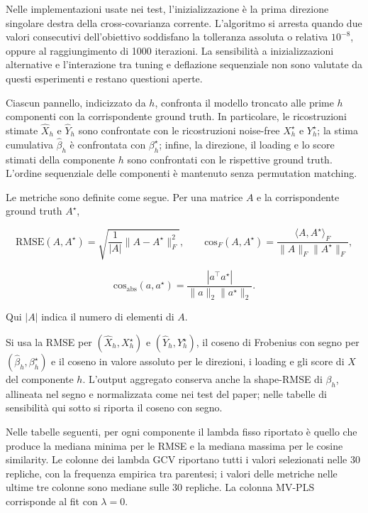 \documentclass[11pt,a4paper]{article}
\begin{document}
Nelle implementazioni usate nei test, l'inizializzazione è la prima direzione singolare destra
della cross-covarianza corrente. L'algoritmo si arresta quando due valori consecutivi
dell'obiettivo soddisfano la tolleranza assoluta o relativa $10^{-8}$, oppure al raggiungimento
di 1000 iterazioni. La sensibilità a inizializzazioni alternative e l'interazione tra tuning e
deflazione sequenziale non sono valutate da questi esperimenti e restano questioni aperte.

Ciascun pannello, indicizzato da $h$, confronta il modello troncato alle prime $h$ componenti con
la corrispondente ground truth. In particolare, le ricostruzioni stimate
$\widehat X_h$ e $\widehat Y_h$ sono confrontate con le ricostruzioni noise-free
$X_h^\star$ e $Y_h^\star$; la stima cumulativa $\widehat\beta_h$ è confrontata con
$\beta_h^\star$; infine, la direzione, il loading e lo score stimati della componente $h$ sono
confrontati con le rispettive ground truth. L'ordine sequenziale delle componenti è
mantenuto senza permutation matching.

Le metriche sono definite come segue. Per una matrice $A$ e la corrispondente ground truth $A^\star$,

\[
  \mathrm{RMSE}(A,A^\star) =
  \sqrt{\frac{1}{|A|}\|A-A^\star\|_F^2},
  \qquad
  \mathrm{cos}_F(A,A^\star) =
  \frac{\langle A,A^\star\rangle_F}{\|A\|_F\|A^\star\|_F},
\]

\[
  \mathrm{cos}_{\mathrm{abs}}(a,a^\star) =
  \frac{|a^\top a^\star|}{\|a\|_2\|a^\star\|_2}.
\]

Qui $|A|$ indica il numero di elementi di $A$.

Si usa la RMSE per $(\widehat X_h,X_h^\star)$ e $(\widehat Y_h,Y_h^\star)$, il coseno di
Frobenius con segno per $(\widehat\beta_h,\beta_h^\star)$ e il coseno in valore assoluto
per le direzioni, i loading e gli score di $X$ del componente $h$. L'output aggregato conserva
anche la shape-RMSE di $\beta_h$, allineata nel segno e normalizzata come nei test del paper;
nelle tabelle di sensibilità qui sotto si riporta il coseno con segno.

Nelle tabelle seguenti, per ogni componente il lambda fisso riportato è quello che produce la
mediana minima per le RMSE e la mediana massima per le cosine similarity. Le colonne dei lambda
GCV riportano tutti i valori selezionati nelle 30 repliche, con la frequenza empirica tra parentesi;
i valori delle metriche nelle ultime tre colonne sono mediane sulle 30 repliche. La colonna MV-PLS
corrisponde al fit con $\lambda=0$.
\end{document}
